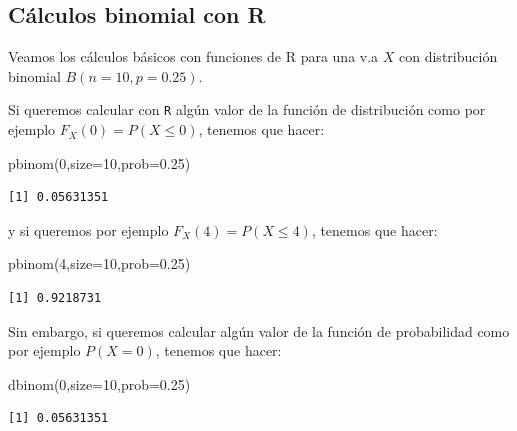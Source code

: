 \documentclass[
  letterpaper,
  DIV=11,
  numbers=noendperiod]{scrreprt}
\newenvironment{Shaded}{\begin{snugshade}}{\end{snugshade}}
\newcommand{\AttributeTok}[1]{\textcolor[rgb]{0.40,0.45,0.13}{#1}}
\newcommand{\DecValTok}[1]{\textcolor[rgb]{0.68,0.00,0.00}{#1}}
\newcommand{\FloatTok}[1]{\textcolor[rgb]{0.68,0.00,0.00}{#1}}
\newcommand{\FunctionTok}[1]{\textcolor[rgb]{0.28,0.35,0.67}{#1}}
\newcommand{\NormalTok}[1]{\textcolor[rgb]{0.00,0.23,0.31}{#1}}
\begin{document}
\subsection{Cálculos binomial con R}\label{cuxe1lculos-binomial-con-r}

Veamos los cálculos básicos con funciones de R para una v.a \(X\) con
distribución binomial \(B(n=10,p=0.25)\).

Si queremos calcular con \texttt{R} algún valor de la función de
distribución como por ejemplo \(F_X(0)=P(X\leq 0)\), tenemos que hacer:

\begin{Shaded}
\begin{Highlighting}[]
\FunctionTok{pbinom}\NormalTok{(}\DecValTok{0}\NormalTok{,}\AttributeTok{size=}\DecValTok{10}\NormalTok{,}\AttributeTok{prob=}\FloatTok{0.25}\NormalTok{)}
\end{Highlighting}
\end{Shaded}

\begin{verbatim}
[1] 0.05631351
\end{verbatim}

y si queremos por ejemplo \(F_X(4)=P(X\leq 4)\), tenemos que hacer:

\begin{Shaded}
\begin{Highlighting}[]
\FunctionTok{pbinom}\NormalTok{(}\DecValTok{4}\NormalTok{,}\AttributeTok{size=}\DecValTok{10}\NormalTok{,}\AttributeTok{prob=}\FloatTok{0.25}\NormalTok{)}
\end{Highlighting}
\end{Shaded}

\begin{verbatim}
[1] 0.9218731
\end{verbatim}

Sin embargo, si queremos calcular algún valor de la función de
probabilidad como por ejemplo \(P(X=0)\), tenemos que hacer:

\begin{Shaded}
\begin{Highlighting}[]
\FunctionTok{dbinom}\NormalTok{(}\DecValTok{0}\NormalTok{,}\AttributeTok{size=}\DecValTok{10}\NormalTok{,}\AttributeTok{prob=}\FloatTok{0.25}\NormalTok{)}
\end{Highlighting}
\end{Shaded}

\begin{verbatim}
[1] 0.05631351
\end{verbatim}
\end{document}
